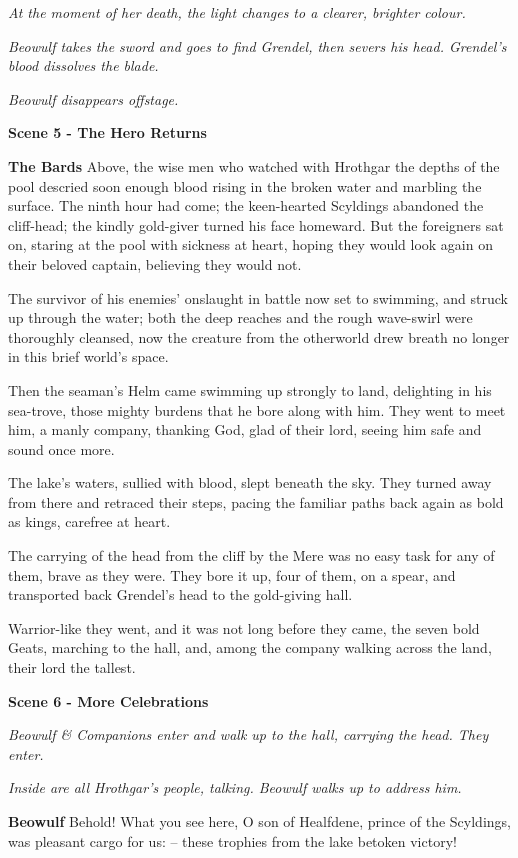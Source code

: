 \documentclass[a4paper]{article}
\begin{document}
{\centerline{\textit{At the moment of her death, the light changes to a clearer, brighter colour.}}
\centerline{\textit{Beowulf takes the sword and goes to find Grendel, then severs his head. Grendel's blood dissolves the blade.}}

\centerline{\textit{Beowulf disappears offstage.}}

\newpage
\centerline{\textbf{Scene 5 - The Hero Returns}}

\textbf{The Bards} Above, the wise men who watched with Hrothgar
the depths of the pool descried soon enough
blood rising in the broken water
and marbling the surface. 
The ninth hour had come; the keen-hearted Scyldings
abandoned the cliff-head; the kindly gold-giver
turned his face homeward. But the foreigners sat on,
staring at the pool with sickness at heart,
hoping they would look again on their beloved captain,
believing they would not.

The survivor of his enemies' onslaught in battle
now set to swimming, and struck up through the water;
both the deep reaches and the rough wave-swirl
were thoroughly cleansed, now the creature from the otherworld
drew breath no longer in this brief world's space.

Then the seaman's Helm came swimming up
strongly to land, delighting in his sea-trove,
those mighty burdens that he bore along with him.
They went to meet him, a manly company,
thanking God, glad of their lord,
seeing him safe and sound once more.

The lake's waters,
sullied with blood, slept beneath the sky.
They turned away from there and retraced their steps,
pacing the familiar paths back again
as bold as kings, carefree at heart.

The carrying of the head from the cliff by the Mere
was no easy task for any of them,
brave as they were. They bore it up,
four of them, on a spear, and transported back
Grendel's head to the gold-giving hall.

Warrior-like they went, and it was not long
before they came, the seven bold Geats,
marching to the hall, and, among the company
walking across the land, their lord the tallest.

\newpage
\centerline{\textbf{Scene 6 - More Celebrations}}

\centerline{\textit{Beowulf \& Companions enter and walk up to the hall, carrying the head. They enter.}}
\centerline{\textit{Inside are all Hrothgar's people, talking. Beowulf walks up to address him.}}

\textbf{Beowulf} Behold! What you see here, O son of Healfdene,
prince of the Scyldings, was pleasant cargo for us:
– these trophies from the lake betoken victory!

}
\end{document}
